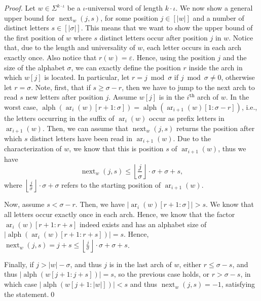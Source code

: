 \documentclass[runningheads,UKenglish,cleveref, autoref, thm-restate]{llncs}
\DeclareMathOperator{\ar}{ar}
\DeclareMathOperator{\alphabet}{alph}
\DeclareMathOperator{\al}{alph}
\DeclareMathOperator{\nextAlphPos}{next}
\begin{document}
\begin{proof}
	Let $w\in\Sigma^{k\cdot\iota}$ be a $\iota$-universal word of length $k\cdot\iota$. We now show a general upper bound for $\nextAlphPos_w(j,s)$, for some position $j\in[|w|]$ and a number of distinct letters $s\in[|\sigma|]$. This means that we want to show the upper bound of the first position of $w$ where $s$ distinct letters occur after position $j$ in $w$. Notice that, due to the length and universality of $w$, each letter occurs in each arch exactly once. Also notice that $r(w)=\varepsilon$. Hence, using the position $j$ and the size of the alphabet $\sigma$, we can exactly define the position $r$ inside the arch in which $w[j]$ is located.
	In particular, let $r = j\bmod\sigma$ if $j\bmod\sigma\neq0$, otherwise let $r = \sigma$.
	Note, first, that if $s \geq \sigma - r$, then we have to jump to the next arch to read $s$ new letters after position $j$. Assume $w[j]$ is in the $i^{\mathtt{th}}$ arch of $w$.
	In the worst case, $\al(\ar_i(w)[r+1 : \sigma]) = \al(\ar_{i+1}(w)[1 : \sigma-r])$, i.e., the letters occurring in the suffix of $\ar_i(w)$ occur as prefix letters in $\ar_{i+1}(w)$. Then, we can assume that $\nextAlphPos_w(j,s)$ returns the position after which $s$ distinct letters have been read in $\ar_{i+1}(w)$. Due to the characterization of $w$, we know that this is position $s$ of $\ar_{i+1}(w)$, thus we have
	$$ \nextAlphPos_w(j,s) \leq \left\lfloor\frac{j}{\sigma}\right\rfloor\cdot\sigma + \sigma + s, $$
	where $\left\lfloor\frac{j}{\sigma}\right\rfloor\cdot\sigma + \sigma$ refers to the starting position of $\ar_{i+1}(w)$.

	Now, assume $s < \sigma-r$. Then, we have $|\ar_i(w)[r+1 : \sigma]| > s$. We know that all letters occur exactly once in each arch. Hence, we know that the factor $\ar_i(w)[r+1 : r+s]$ indeed exists and has an alphabet size of $|\al(\ar_i(w)[r+1 : r+s])| = s$. Hence, $\nextAlphPos_w(j,s) = j+s \leq \left\lfloor\frac{j}{\sigma}\right\rfloor\cdot\sigma + \sigma + s$.

	Finally, if $j > |w| - \sigma$, and thus $j$ is in the last arch of $w$, either $r \leq \sigma - s$, and thus $\vert \alphabet(w[j + 1:j + s]) \vert = s$, so the previous case holds, or $r > \sigma - s$, in which case $\vert \alphabet(w[j + 1:\vert w \vert]) \vert < s$ and thus $\nextAlphPos_w(j,s) = -1$, satisfying the statement.\qed
	
	
\end{proof}
\end{document}
